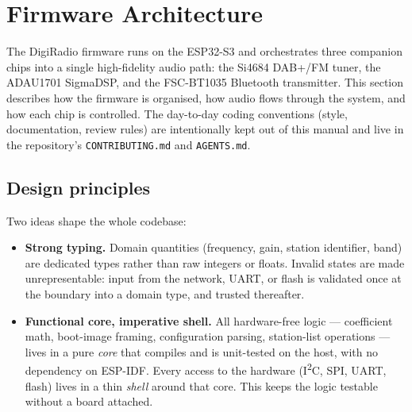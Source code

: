 %
%

\chapter{Firmware Architecture}
\label{ch:firmware}
\label{sec:firmware-architecture}

The DigiRadio firmware runs on the ESP32-S3 and orchestrates three
companion chips into a single high-fidelity audio path: the Si4684
DAB+/FM tuner, the ADAU1701 SigmaDSP, and the FSC-BT1035 Bluetooth
transmitter. This section describes how the firmware is organised, how
audio flows through the system, and how each chip is controlled. The
day-to-day coding conventions (style, documentation, review rules) are
intentionally kept out of this manual and live in the repository's
\texttt{CONTRIBUTING.md} and \texttt{AGENTS.md}.

\section{Design principles}
\label{sec:fw-principles}

Two ideas shape the whole codebase:

\begin{itemize}
  \item \textbf{Strong typing.} Domain quantities (frequency, gain,
    station identifier, band) are dedicated types rather than raw
    integers or floats. Invalid states are made unrepresentable: input
    from the network, UART, or flash is validated once at the boundary
    into a domain type, and trusted thereafter.
  \item \textbf{Functional core, imperative shell.} All hardware-free
    logic --- coefficient math, boot-image framing, configuration
    parsing, station-list operations --- lives in a pure \emph{core}
    that compiles and is unit-tested on the host, with no dependency on
    ESP-IDF. Every access to the hardware (I\textsuperscript{2}C, SPI,
    UART, flash) lives in a thin \emph{shell} around that core. This
    keeps the logic testable without a board attached.
\end{itemize}

